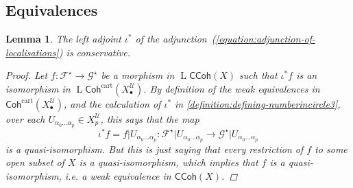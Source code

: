 \documentclass[11pt,fleqn]{article}
\theoremstyle{plain}
\newtheorem{lemma}[theorem]{Lemma}
\theoremstyle{definition}
\theoremstyle{remark}
\numberwithin{equation}{theorem}
\newcommand{\cover}{\mathcal{U}}
\newcommand{\anotherbullet}{\star}
\newcommand{\restricted}{\mathbin{\big\vert}}
\newcommand{\gccohX}{\mathsf{CCoh}(X)}
\newcommand{\cartcohX}{\mathsf{Coh}^\mathrm{cart}(X_\bullet^\cover)}
\newcommand{\nerve}[1]{X_{#1}^\cover}
\DeclareMathOperator{\LL}{L}
\begin{document}
    \subsection{Equivalences}

        \begin{lemma}\label{lemma:left-adjoint-is-conservative}
            The left adjoint $\iota^*$ of the adjunction~(\ref{equation:adjunction-of-localisations}) is conservative.
            \begin{proof}
                Let $f\colon \mathscr{F}^\anotherbullet\to\mathscr{G}^\anotherbullet$ be a morphism in $\LL{\gccohX}$ such that $\iota^*f$ is an isomorphism in $\LL{\cartcohX}$.
                By definition of the weak equivalences in $\cartcohX$, and the calculation of $\iota^*$ in \cref{definition:defining-numberincircle3}, over each $U_{\alpha_0\ldots\alpha_p}\in\nerve{p}$, this says that the map
                \[
                    \iota^*f = f\restricted U_{\alpha_0\ldots\alpha_p}
                    \colon
                    \mathscr{F}^\anotherbullet \restricted U_{\alpha_0\ldots\alpha_p}
                    \to
                    \mathscr{G}^\anotherbullet \restricted U_{\alpha_0\ldots\alpha_p}
                \]
                is a quasi-isomorphism.
                But this is just saying that every restriction of $f$ to some open subset of $X$ is a quasi-isomorphism, which implies that $f$ is a quasi-isomorphism, i.e. a weak equivalence in $\gccohX$.
            \end{proof}
        \end{lemma}
\end{document}
